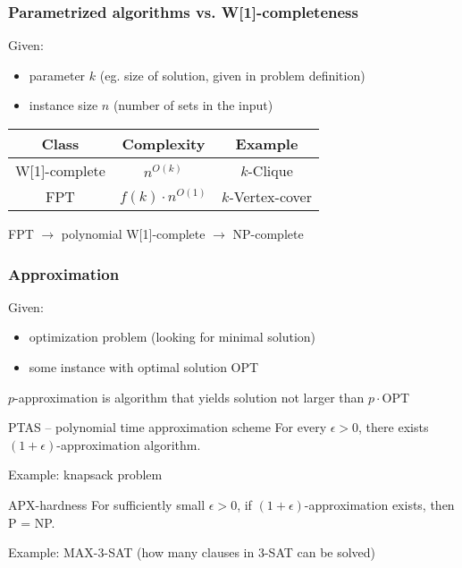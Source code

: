 \documentclass{beamer}
\begin{document}
\begin{frame}
\frametitle{Parametrized algorithms vs. W[1]-completeness}
Given:
\begin{itemize}
\item parameter $k$ (eg. size of solution, given in problem definition)
\item instance size $n$ (number of sets in the input)
\end{itemize}
\bigskip

\begin{tabular}{|c|c|c|}
\hline
\textbf{Class} & \textbf{Complexity} & \textbf{Example}\\
\hline
W[1]-complete & $n^{O(k)}$ & $k$-Clique\\
\hline
FPT & $f(k) \cdot n^{O(1)}$ & $k$-Vertex-cover\\
\hline
\end{tabular}

\bigskip
FPT $\rightarrow$ polynomial\newline
W[1]-complete $\rightarrow$ NP-complete

\end{frame}


\begin{frame}
\frametitle{Approximation}
Given:
\begin{itemize}
\item optimization problem (looking for minimal solution)
\item some instance with optimal solution OPT
\end{itemize}
$p$-approximation is algorithm that yields solution not larger than
$p\cdot$OPT
\begin{block}{PTAS -- polynomial time approximation scheme}
For every $\epsilon > 0$, there exists $(1+\epsilon)$-approximation
algorithm.

Example: knapsack problem

\end{block}

\begin{block}{APX-hardness}
For sufficiently small $\epsilon > 0$,
if $(1+\epsilon)$-approximation exists, then P = NP.

Example: MAX-3-SAT (how many clauses in 3-SAT can be solved)
\end{block}


\end{frame}
\end{document}
